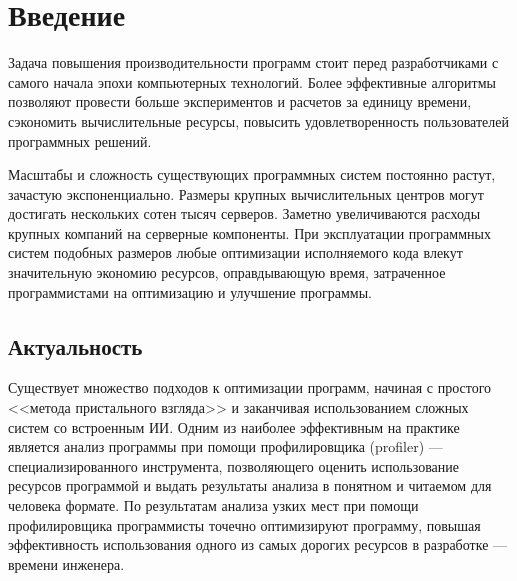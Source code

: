 \section{Введение}

\epigraph{
}{
}

Задача повышения производительности программ стоит перед разработчиками с самого начала эпохи компьютерных технологий.
Более эффективные алгоритмы позволяют провести больше экспериментов и расчетов за единицу времени,
сэкономить вычислительные ресурсы, повысить удовлетворенность пользователей программных решений.

Масштабы и сложность существующих программных систем постоянно растут, зачастую экспоненциально.
Размеры крупных вычислительных центров могут достигать нескольких сотен тысяч серверов.
Заметно увеличиваются расходы крупных компаний на серверные компоненты.
При эксплуатации программных систем подобных размеров любые оптимизации исполняемого кода влекут значительную экономию ресурсов, оправдывающую время, затраченное программистами на оптимизацию и улучшение программы.

\subsection{Актуальность}
Существует множество подходов к оптимизации программ, начиная с простого <<метода пристального взгляда>>
и заканчивая использованием сложных систем со встроенным ИИ.
Одним из наиболее эффективным на практике является анализ программы при помощи профилировщика (profiler)
--- специализированного инструмента, позволяющего оценить использование ресурсов программой
и выдать результаты анализа в понятном и читаемом для человека формате.
По результатам анализа узких мест при помощи профилировщика программисты точечно оптимизируют программу,
повышая эффективность использования одного из самых дорогих ресурсов в разработке --- времени инженера.

